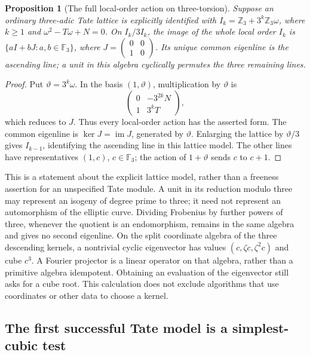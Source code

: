 \documentclass[11pt]{article}
\newtheorem{proposition}[theorem]{Proposition}
\theoremstyle{definition}
\theoremstyle{remark}
\begin{document}
\begin{proposition}[The full local-order action on three-torsion]
\label{prop:local-order-descending-lines}
Suppose an ordinary three-adic Tate lattice is explicitly identified
with \(I_k=\mathbb Z_3+3^k\mathbb Z_3\omega\), where \(k\geq1\) and
\(\omega^2-T\omega+N=0\). On \(I_k/3I_k\), the image of the whole
local order \(I_k\) is \(\{aI+bJ:a,b\in\mathbb F_3\}\), where
\(J=\left(\begin{smallmatrix}0&0\\1&0\end{smallmatrix}\right)\).
Its unique common eigenline is the ascending line; a unit in this
algebra cyclically permutes the three remaining lines.
\end{proposition}
\begin{proof}
Put \(\vartheta=3^k\omega\). In the basis \((1,\vartheta)\),
multiplication by \(\vartheta\) is
\[
 \begin{pmatrix}0&-3^{2k}N\\1&3^kT\end{pmatrix},
\]
which reduces to \(J\). Thus every local-order action has the asserted
form. The common eigenline is \(\ker J=\operatorname{im}J\), generated
by \(\vartheta\). Enlarging the lattice by \(\vartheta/3\) gives
\(I_{k-1}\), identifying the ascending line in this lattice model.
The other lines have representatives \((1,c)\), \(c\in\mathbb F_3\);
the action of \(1+\vartheta\) sends \(c\) to \(c+1\).
\end{proof}

This is a statement about the explicit lattice model, rather than a
freeness assertion for an unspecified Tate module. A unit in its
reduction modulo three may represent an isogeny of degree prime to
three; it need not represent an automorphism of the elliptic curve.
Dividing Frobenius by further powers of three, whenever the quotient
is an endomorphism, remains in the same algebra and gives no second
eigenline. On the split coordinate algebra of the three descending
kernels, a nontrivial cyclic eigenvector has values
\((c,\zeta c,\zeta^2c)\) and cube \(c^3\). A Fourier projector is a
linear operator on that algebra, rather than a primitive algebra
idempotent. Obtaining an evaluation of the eigenvector still asks for
a cube root. This calculation does not exclude algorithms that use
coordinates or other data to choose a kernel.

\subsection{The first successful Tate model is a simplest-cubic test}
\end{document}
